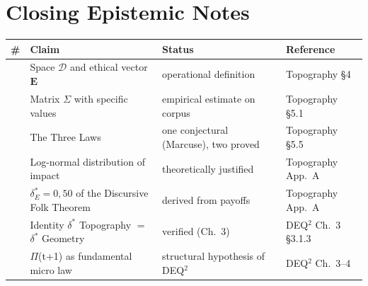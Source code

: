 \section{Closing Epistemic Notes}\label{closing-epistemic-notes-ch1}

{\def\LTcaptype{none} %
{\small\begin{longtable}[]{@{}
  >{\raggedright\arraybackslash}p{}
  >{\raggedright\arraybackslash}p{}
  >{\raggedright\arraybackslash}p{}
  >{\raggedright\arraybackslash}p{}@{}}
\toprule\noalign{}
\begin{minipage}[b]{\linewidth}\raggedright
\#
\end{minipage} & \begin{minipage}[b]{\linewidth}\raggedright
Claim
\end{minipage} & \begin{minipage}[b]{\linewidth}\raggedright
Status
\end{minipage} & \begin{minipage}[b]{\linewidth}\raggedright
Reference
\end{minipage} \\
\midrule\noalign{}
\endhead
\bottomrule\noalign{}
\endlastfoot
1 & Space \(\mathcal{D}\) and ethical vector \(\mathbf{E}\) & \Proved{}
operational definition & Topography \S{}4 \\
2 & Matrix \(\Sigma\) with specific values & \Proved{} empirical estimate
on corpus & Topography \S{}5.1 \\
3 & The Three Laws & \Proved{} one conjectural (Marcuse), two proved
& Topography \S{}5.5 \\
4 & Log-normal distribution of impact & \Proved{} theoretically
justified & Topography App.~A \\
5 & \(\delta^*_E = 0{,}50\) of the Discursive Folk Theorem & \Proved{}
derived from payoffs & Topography App.~A \\
6 & Identity \(\delta^*\) Topography \(=\) \(\delta^*\) Geometry &
\Proved{} verified (Ch.~3) & DEQ$^2$ Ch.~3 \S{}3.1.3 \\
7 & $\Pi$(t+1) as fundamental micro law & \Hypoth{} structural hypothesis
of DEQ$^2$ & DEQ$^2$ Ch.~3--4 \\
\end{longtable}}
}
